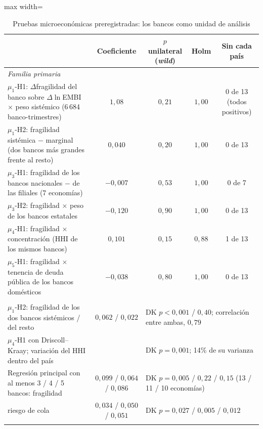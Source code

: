 \begin{table}[htbp]
\centering
\small
\caption[Pruebas microeconómicas preregistradas]{Pruebas microeconómicas preregistradas: los bancos como unidad de análisis}
\label{tab:micro-prereg}
\begin{adjustbox}{max width=\linewidth}
\begin{tabular}{l c c c c}
\toprule
 & Coeficiente & $p$ unilateral (\textit{wild}) & Holm & Sin cada país \\
\midrule
\multicolumn{5}{l}{\textit{Familia primaria}} \\
\quad $\mu_{1}$-H1: $\Delta$fragilidad del banco sobre $\Delta\ln$EMBI $\times$ peso sistémico (6\,684 banco-trimestres) & $1{,}08$ & $0{,}21$ & $1{,}00$ & 0 de 13 (todos positivos) \\
\quad $\mu_{1}$-H2: fragilidad sistémica $-$ marginal (dos bancos más grandes frente al resto) & $0{,}040$ & $0{,}20$ & $1{,}00$ & 0 de 13 \\
\quad $\mu_{3}$-H1: fragilidad de los bancos nacionales $-$ de las filiales (7 economías) & $-0{,}007$ & $0{,}53$ & $1{,}00$ & 0 de 7 \\
\quad $\mu_{3}$-H2: fragilidad $\times$ peso de los bancos estatales & $-0{,}120$ & $0{,}90$ & $1{,}00$ & 0 de 13 \\
\quad $\mu_{4}$-H1: fragilidad $\times$ concentración (HHI de los mismos bancos) & $0{,}101$ & $0{,}15$ & $0{,}88$ & 1 de 13 \\
\quad $\mu_{5}$-H1: fragilidad $\times$ tenencia de deuda pública de los bancos domésticos & $-0{,}038$ & $0{,}80$ & $1{,}00$ & 0 de 13 \\
\addlinespace
\multicolumn{5}{l}{\textit{Detalle y secundarias}} \\
\quad $\mu_{1}$-H2: fragilidad de los dos bancos sistémicos / del resto & $0{,}062$ / $0{,}022$ & \multicolumn{3}{l}{DK $p<0{,}001$ / $0{,}40$; correlación entre ambas, $0{,}79$} \\
\quad $\mu_{4}$-H1 con Driscoll--Kraay; variación del HHI dentro del país & & \multicolumn{3}{l}{DK $p=0{,}001$; 14\% de su varianza} \\
\quad Regresión principal con al menos 3 / 4 / 5 bancos: fragilidad & $0{,}099$ / $0{,}064$ / $0{,}086$ & \multicolumn{3}{l}{DK $p=0{,}005$ / $0{,}22$ / $0{,}15$ (13 / 11 / 10 economías)} \\
\quad \quad riesgo de cola & $0{,}034$ / $0{,}050$ / $0{,}051$ & \multicolumn{3}{l}{DK $p=0{,}027$ / $0{,}005$ / $0{,}012$} \\
\addlinespace

\end{tabular}
\end{adjustbox}
\end{table}
